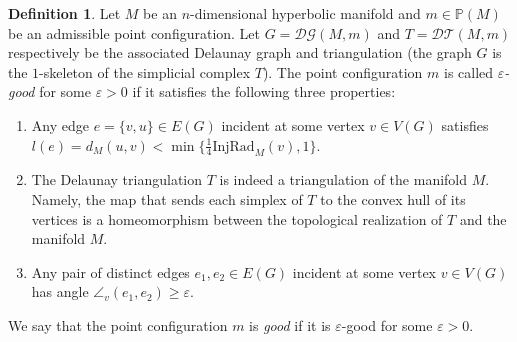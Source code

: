 \documentclass{amsart}
\newcommand{\Points}{\mathbb{P}}
\newcommand{\DelanGraph}{\mathcal{DG}}
\newcommand{\DelanComplex}{\mathcal{DT}}
\theoremstyle{plain}
\newtheorem{remark}[theorem]{Remark}
\numberwithin{equation}{section}
\theoremstyle{definition}
\newtheorem{definition}[theorem]{Definition}
\begin{document}
\begin{definition}
\label{def:good points} \label{good:points}
Let $M$ be an $n$-dimensional hyperbolic manifold and $m \in \Points(M)$ be an admissible point configuration. Let $G = \DelanGraph(M,m)$ and $T = \DelanComplex(M,m)$ respectively be the associated Delaunay graph and triangulation (the graph $G$ is the $1$-skeleton of the simplicial complex $T$). The point configuration $m$ is called \emph{$\varepsilon$-good} for some $\varepsilon > 0$ if it satisfies the following three properties:
\begin{enumerate}[label = (G\arabic*)]
\item \label{good: length} Any edge $e = \{v,u\} \in E(G)$ incident at some vertex $v \in V(G)$  satisfies $l(e) = d_M(u,v) < \min\{\frac{1}{4} \mathrm{InjRad}_M(v),1\}$.
 \item \label{good: triangulation} The Delaunay triangulation $T$ is indeed a triangulation of the manifold $M$. Namely, the map that sends each simplex of $T$ to the convex hull of its vertices is a homeomorphism between the topological realization of $T$ and the manifold $M$.
 
    \item \label{good: angle} 
    Any pair of distinct edges $e_1,e_2 \in E(G)$ incident  at some vertex $v \in  V(G)$ has angle $\angle_v(e_1,e_2) \ge \varepsilon$.
    
   
\end{enumerate}
We say that the point configuration $m$ is  \emph{good} if it is $\varepsilon$-good for some $\varepsilon>0$. 
\end{definition}

\end{document}

